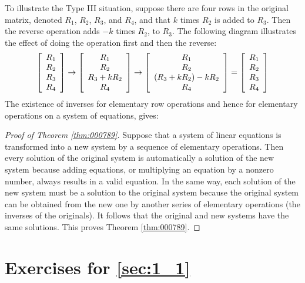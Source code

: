 To illustrate the Type III situation, suppose there are four rows in the original matrix, denoted $R_1$, $R_2$, $R_3$, and $R_4$, and that $k$ times $R_2$ is added to $R_3$. Then the reverse operation adds $-k$ times $R_2$, to $R_3$. The following diagram illustrates the effect of doing the operation first and then the reverse:
\begin{equation*}
\left[ \begin{array}{c}
	R_1 \\
	R_2 \\
	R_3 \\
	R_4
\end{array} \right]
\rightarrow
\left[ \begin{array}{c}
R_1 \\
R_2 \\
R_3 + kR_2\\
R_4
\end{array} \right]
\rightarrow
\left[ \begin{array}{c}
R_1 \\
R_2 \\
(R_3 + kR_2) - kR_2\\
R_4
\end{array} \right]
=
\left[ \begin{array}{c}
R_1 \\
R_2 \\
R_3 \\
R_4
\end{array} \right]
\end{equation*}
The existence of inverses for elementary row operations and hence for elementary operations on a system of equations, gives:

\begin{proof}[Proof of Theorem \ref{thm:000789}]
Suppose that a system of linear equations is transformed into a new system by a sequence of elementary operations. Then every solution of the original system is automatically a solution of the new system because adding equations, or multiplying an equation by a nonzero number, always results in a valid equation. In the same way, each solution of the new system must be a solution to the original system because the original system can be obtained from the new one by another series of elementary operations (the inverses of the originals). It follows that the original and new systems have the same solutions. This proves Theorem \ref{thm:000789}.
\end{proof}


\section*{Exercises for \ref{sec:1_1}}

